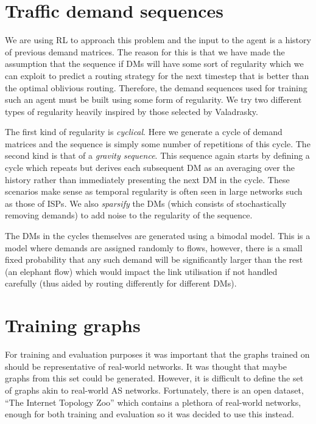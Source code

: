 \section{Traffic demand sequences}
We are using RL to approach this problem and the input to the agent is a history of previous demand matrices. The reason for this is that we have made the assumption that the sequence if DMs will have some sort of regularity which we can exploit to predict a routing strategy for the next timestep that is better than the optimal oblivious routing. Therefore, the demand sequences used for training such an agent must be built using some form of regularity. We try two different types of regularity heavily inspired by those selected by Valadrasky\cite{valadarsky2017learning}.

The first kind of regularity is \emph{cyclical}. Here we generate a cycle of demand matrices and the sequence is simply some number of repetitions of this cycle. The second kind is that of a \emph{gravity sequence}\cite{roughan2002experience}. This sequence again starts by defining a cycle which repeats but derives each subsequent DM as an averaging over the history rather than immediately presenting the next DM in the cycle. These scenarios make sense as temporal regularity is often seen in large networks such as those of ISPs\cite{fortz2002optimizing}. We also \emph{sparsify} the DMs (which consists of stochastically removing demands) to add noise to the regularity of the sequence.


The DMs in the cycles themselves are generated using a bimodal model\cite{medina2002traffic}. This is a model where demands are assigned randomly to flows, however, there is a small fixed probability that any such demand will be significantly larger than the rest (an elephant flow) which would impact the link utilisation if not handled carefully (thus aided by routing differently for different DMs).

\section{Training graphs}
For training and evaluation purposes it was important that the graphs trained on should be representative of real-world networks. It was thought that maybe graphs from this set could be generated. However, it is difficult to define the set of graphs akin to real-world AS networks. Fortunately, there is an open dataset, ``The Internet Topology Zoo''\cite{6027859} which contains a plethora of real-world networks, enough for both training and evaluation so it was decided to use this instead.
